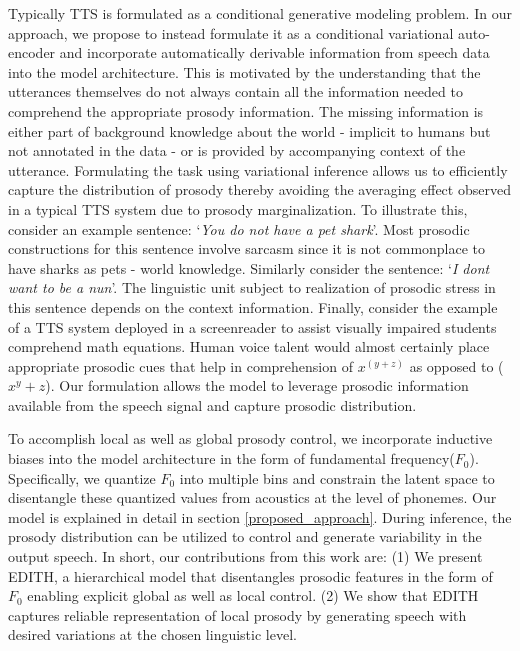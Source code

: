Typically TTS is formulated as a conditional generative modeling problem. In our approach, we propose to instead formulate it as a conditional variational auto-encoder and incorporate automatically derivable information from speech data into the model architecture. This is motivated by the understanding that the utterances themselves do not always contain all the information needed to comprehend the appropriate prosody information. The missing information is either part of background knowledge about the world - implicit to humans but not annotated in the data - or is provided by accompanying context of the utterance. Formulating the task using variational inference allows us to efficiently capture the distribution of prosody thereby avoiding the averaging effect observed in a typical TTS system due to prosody marginalization. To illustrate this, consider an example sentence: `\textit{You do not have a pet shark}'. Most prosodic constructions for this sentence involve sarcasm since it is not commonplace to have sharks as pets - world knowledge. Similarly consider the sentence: `\textit{I dont want to be a nun}'. The linguistic unit subject to realization of prosodic stress in this sentence depends on the context information. Finally, consider the example of a TTS system deployed in a screenreader to assist visually impaired students comprehend math equations. Human voice talent would almost certainly place appropriate prosodic cues that help in comprehension of $x^{(y+z)}$  as opposed to ($x^y + z$). Our formulation allows the model to leverage prosodic information available from the speech signal and capture prosodic distribution. 

To accomplish local as well as global prosody control, we incorporate inductive biases into the model architecture in the form of fundamental frequency($F_0$). Specifically, we quantize $F_0$ into multiple bins and constrain the latent space to disentangle these quantized values from acoustics at the level of phonemes. Our model is explained in detail in section \ref{proposed_approach}. During inference, the prosody distribution can be utilized to control and generate variability in the output speech. In short, our contributions from this work are: (1) We present EDITH, a hierarchical model that disentangles prosodic features in the form of $F_0$ enabling explicit global as well as local control. (2) We show that EDITH captures reliable representation of local prosody by generating speech with desired variations at the chosen linguistic level.  

